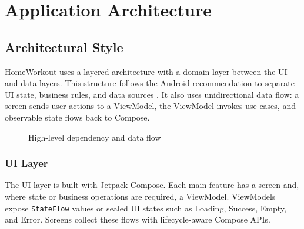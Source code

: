\section{Application Architecture}

\subsection{Architectural Style}

HomeWorkout uses a layered architecture with a domain layer between the UI and data layers. This structure follows the Android recommendation to separate UI state, business rules, and data sources \cite{androidarchitecture}. It also uses unidirectional data flow: a screen sends user actions to a ViewModel, the ViewModel invokes use cases, and observable state flows back to Compose.

\begin{figure}[ht]
\centering
{}
\caption{High-level dependency and data flow}
\label{fig:architecture}
\end{figure}

\subsubsection{UI Layer}

The UI layer is built with Jetpack Compose. Each main feature has a screen and, where state or business operations are required, a ViewModel. ViewModels expose \texttt{StateFlow} values or sealed UI states such as Loading, Success, Empty, and Error. Screens collect these flows with lifecycle-aware Compose APIs.

